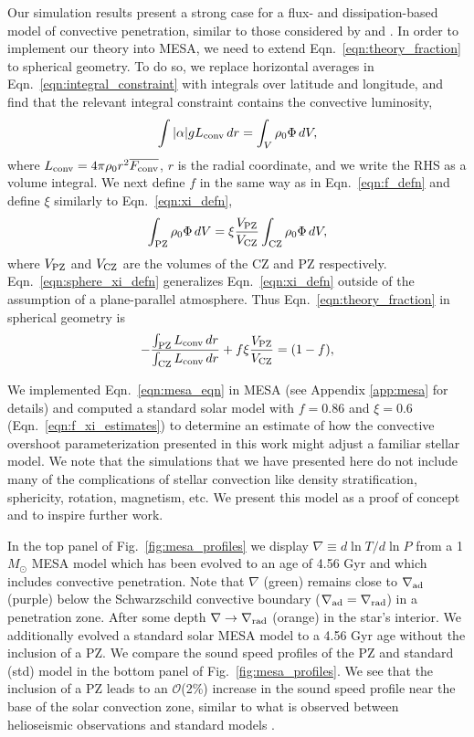 \documentclass[twocolumn]{aastex631}
\newcommand{\gradrad}{\ensuremath{\nabla_{\rm{rad}}}}
\newcommand{\gradad}{\ensuremath{\nabla_{\rm{ad}}}}
\newcommand{\justgrad}{\ensuremath{\nabla}}
\renewcommand{\bar}[1]{\overline{#1}}
\begin{document}
Our simulation results present a strong case for a flux- and dissipation-based model of convective penetration, similar to those considered by \citet{zahn1991} and \citet{roxburgh1989}.
In order to implement our theory into MESA, we need to extend Eqn.~\ref{eqn:theory_fraction} to spherical geometry.
To do so, we replace horizontal averages in Eqn.~\ref{eqn:integral_constraint} with integrals over latitude and longitude, and find that the relevant integral constraint contains the convective luminosity,
\begin{equation}
\int |\alpha| g L_{\rm{conv}}\,dr =   \int_V \rho_0 \Phi\,dV,
\label{eqn:mesa_integral_constraint}
\end{equation}
where $L_{\rm{conv}} = 4\pi\rho_0 r^2 \bar{F_{\rm{conv}}}$, $r$ is the radial coordinate, and we write the RHS as a volume integral.
We next define $f$ in the same way as in Eqn.~\ref{eqn:f_defn} and define $\xi$ similarly to Eqn.~\ref{eqn:xi_defn},
\begin{equation}
\int_{\rm{PZ}} \rho_0 \Phi \,dV = \xi \frac{V_{\rm{PZ}}}{V_{\rm{CZ}}}\int_{\rm{CZ}}\rho_0 \Phi \, dV,
\label{eqn:sphere_xi_defn}
\end{equation}
where $V_{\rm{PZ}}$ and $V_{\rm{CZ}}$ are the volumes of the CZ and PZ respectively.
Eqn.~\ref{eqn:sphere_xi_defn} generalizes Eqn.~\ref{eqn:xi_defn} outside of the assumption of a plane-parallel atmosphere.
Thus Eqn.~\ref{eqn:theory_fraction} in spherical geometry is
\begin{equation}
-\frac{\int_{\rm{PZ}} L_{\rm{conv}}\,dr}{\int_{\rm{CZ}} L_{\rm{conv}}\,dr} + f \xi \frac{V_{\rm{PZ}}}{V_{\rm{CZ}}} = (1 - f),
\label{eqn:mesa_eqn}
\end{equation}

We implemented Eqn.~\ref{eqn:mesa_eqn} in MESA (see Appendix \ref{app:mesa} for details) and computed a standard solar model with $f = 0.86$ and $\xi = 0.6$ (Eqn.~\ref{eqn:f_xi_estimates}) to determine an estimate of how the convective overshoot parameterization presented in this work might adjust a familiar stellar model.
We note that the simulations that we have presented here do not include many of the complications of stellar convection like density stratification, sphericity, rotation, magnetism, etc.
We present this model as a proof of concept and to inspire further work.

In the top panel of Fig.~\ref{fig:mesa_profiles} we display $\justgrad \equiv d\ln T/d\ln P$ from a 1 $M_\odot$ MESA model which has been evolved to an age of 4.56 Gyr and which includes convective penetration.
Note that $\justgrad$ (green) remains close to $\gradad$ (purple) below the Schwarzschild convective boundary ($\gradad = \gradrad$) in a penetration zone.
After some depth $\justgrad \rightarrow \gradrad$ (orange) in the star's interior.
We additionally evolved a standard solar MESA model to a 4.56 Gyr age without the inclusion of a PZ.
We compare the sound speed profiles of the PZ and standard (std) model in the bottom panel of Fig.~\ref{fig:mesa_profiles}.
We see that the inclusion of a PZ leads to an $\mathcal{O}$(2\%) increase in the sound speed profile near the base of the solar convection zone, similar to what is observed between helioseismic observations and standard models \citep{bergemann_serenelli_2014}.
\end{document}
